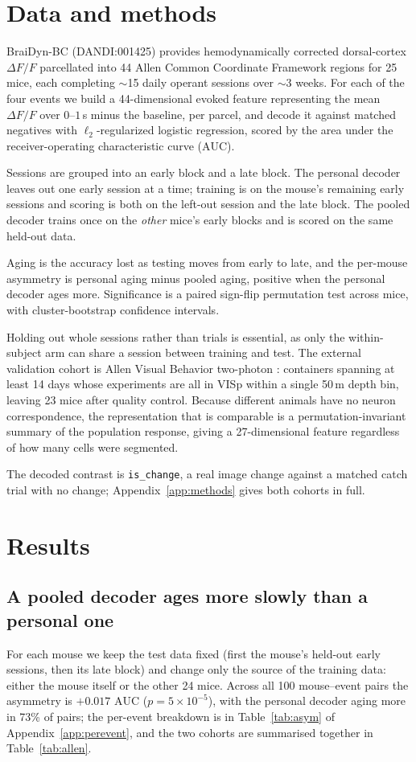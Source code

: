 \documentclass{article}
\newcommand{\auc}{\mathrm{AUC}}
\begin{document}
\section{Data and methods}
BraiDyn-BC \citep{kondo2025} (DANDI:001425) provides hemodynamically corrected dorsal-cortex
$\Delta F/F$ parcellated into 44 Allen Common Coordinate Framework regions for 25 mice, each
completing $\sim$15 daily operant sessions over $\sim$3 weeks. For each of the four events we build a
44-dimensional evoked feature representing the mean $\Delta F/F$ over $0$--$1$\,s minus the baseline,
per parcel, and decode it against matched negatives with $\ell_2$-regularized logistic regression,
scored by the area under the receiver-operating characteristic curve ($\auc$).

Sessions are grouped into an early block and a late block. The personal decoder leaves out one early
session at a time; training is on the mouse's remaining early sessions and scoring is both on the
left-out session and the late block. The pooled decoder trains once on the \emph{other} mice's early
blocks and is scored on the same held-out data.

Aging is the accuracy lost as testing moves from early to late, and the per-mouse asymmetry is
personal aging minus pooled aging, positive when the personal decoder ages more. Significance is a
paired sign-flip permutation test across mice, with cluster-bootstrap confidence intervals.

Holding out whole sessions rather than trials is essential, as only the within-subject arm can share
a session between training and test. The external validation cohort is Allen Visual Behavior
two-photon \citep{allenvb2023}: containers spanning at least 14 days whose experiments are all in
VISp within a single 50\,\textmu m depth bin, leaving 23 mice after quality control. Because
different animals have no neuron correspondence, the representation that is comparable is a
permutation-invariant summary of the population response, giving a 27-dimensional feature regardless
of how many cells were segmented.

The decoded contrast is \texttt{is\_change}, a real image change against a matched catch trial with
no change; Appendix~\ref{app:methods} gives both cohorts in full.

\section{Results}

\subsection{A pooled decoder ages more slowly than a personal one}
\label{sec:asym}
For each mouse we keep the test data fixed (first the mouse's held-out early sessions, then its late
block) and change only the source of the training data: either the mouse itself or the other 24 mice.
Across all 100 mouse--event pairs the asymmetry is $+0.017$ $\auc$ ($p = 5 \times 10^{-5}$), with the
personal decoder aging more in 73\% of pairs; the per-event breakdown is in
Table~\ref{tab:asym} of Appendix~\ref{app:perevent}, and the two cohorts are summarised together
in Table~\ref{tab:allen}.
\end{document}
